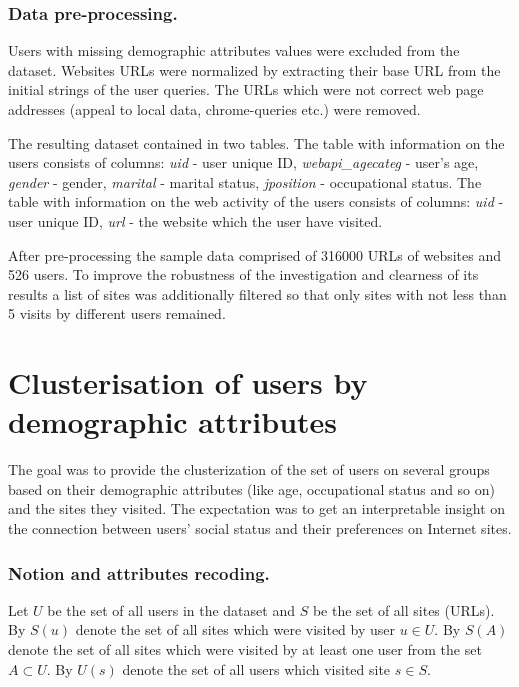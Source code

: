\documentclass[runningheads,a4paper]{llncs}
\begin{document}
\subsubsection{Data pre-processing.}\label{the-treatment}
Users with missing demographic attributes values were excluded from the dataset. Websites URLs were normalized by extracting their base URL from the initial strings of the user queries. The URLs which were not correct web page addresses (appeal to local data, chrome-queries etc.) were removed. 

The resulting dataset contained in two tables. The table with information on the users consists of columns: \textit{uid} - user unique ID, \textit{webapi\_agecateg} - user's age, \textit{gender} - gender, \textit{marital} - marital status, \textit{jposition} - occupational status. The table with information on the web activity of the users consists of columns: \textit{uid} - user unique ID, \textit{url} - the website which the user have visited.


After pre-processing the sample data comprised of 316000 URLs of websites and 526 users. To improve the robustness of the investigation and clearness of its results a list of sites was additionally filtered so that only sites with not less than 5 visits by different users remained.



\section{Clusterisation of users by demographic attributes}

The goal was to provide the clusterization of the set of users on several groups based on their demographic attributes (like age, occupational status and so on) and the sites they visited. The expectation was to get an interpretable insight on the connection between users' social status and their preferences on Internet sites. 





\subsubsection{Notion and attributes recoding.}

Let $U$ be the set of all users in the dataset and $S$ be the set of all sites (URLs). By $S(u)$ denote the set of all sites which were visited by user $u \in U$. By $S(A)$ denote the set of all sites which were visited by at least one user from the set $A \subset U$. By $U(s)$ denote the set of all users which visited site $s \in S$.
\end{document}
